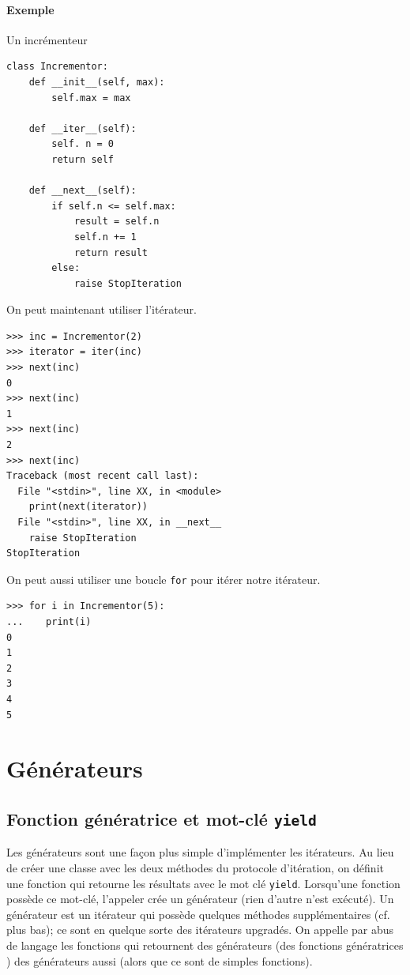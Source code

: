 \documentclass[a4paper, 10pt]{article}
\begin{document}
\paragraph{Exemple} Un incrémenteur
\begin{verbatim}
class Incrementor:
    def __init__(self, max):
        self.max = max

    def __iter__(self):
        self. n = 0
        return self

    def __next__(self):
        if self.n <= self.max:
            result = self.n
            self.n += 1
            return result
        else:
            raise StopIteration
\end{verbatim}
On peut maintenant utiliser l'itérateur.
\begin{verbatim}
>>> inc = Incrementor(2)
>>> iterator = iter(inc)
>>> next(inc)
0
>>> next(inc)
1
>>> next(inc)
2
>>> next(inc)
Traceback (most recent call last):
  File "<stdin>", line XX, in <module>
    print(next(iterator))
  File "<stdin>", line XX, in __next__
    raise StopIteration
StopIteration
\end{verbatim}
On peut aussi utiliser une boucle \texttt{for} pour itérer notre itérateur.
\begin{verbatim}
>>> for i in Incrementor(5):
...    print(i)
0
1
2
3
4
5
\end{verbatim}

\section{Générateurs}
\subsection{Fonction génératrice et mot-clé \texttt{yield}}

Les générateurs sont une façon plus simple d'implémenter les itérateurs. Au lieu de créer une classe avec les deux méthodes du protocole d'itération, on définit une fonction qui retourne les résultats avec le mot clé \texttt{yield}. Lorsqu'une fonction possède ce mot-clé, l'appeler crée un générateur (rien d'autre n'est exécuté). Un générateur est un itérateur qui possède quelques méthodes supplémentaires (cf. plus bas); ce sont en quelque sorte des itérateurs upgradés. On appelle par abus de langage les fonctions qui retournent des générateurs (des \og fonctions génératrices \fg{}) des générateurs aussi (alors que ce sont de simples fonctions).\bigskip
\end{document}
